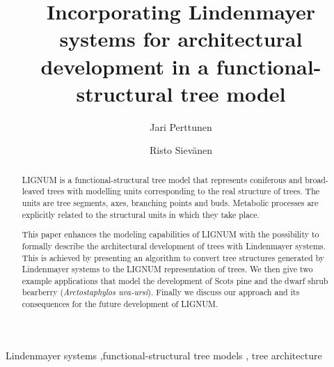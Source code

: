 \documentclass{elsart}
\begin{document}
\begin{frontmatter}


\title{Incorporating Lindenmayer systems for architectural development
in a functional-structural tree model}
\author[Metla]{Jari Perttunen}
\author[Metla]{Risto Siev\"anen}

\address[Metla]{Vantaa   Research  Centre,  Finnish   Forest  Research
Insititute, PL 18.  01301 Vantaa. Finland.}




\begin{abstract}
  LIGNUM  is  a   functional-structural  tree  model  that  represents
  coniferous and broad-leaved trees with modelling units corresponding
  to the real structure of  trees.  The units are tree segments, axes,
  branching  points  and  buds.   Metabolic processes  are  explicitly
  related to the structural units in which they take place.
  
  This  paper enhances the  modeling capabilities  of LIGNUM  with the
  possibility  to formally describe  the architectural  development of
  trees with  Lindenmayer systems. This  is achieved by  presenting an
  algorithm  to  convert  tree  structures  generated  by  Lindenmayer
  systems to  the LIGNUM  representation of trees.   We then  give two
  example applications  that model the  development of Scots  pine and
  the   dwarf  shrub  bearberry   (\textit{Arctostaphylos  uva-ursi}).
  Finally we discuss our approach  and its consequences for the future
  development of LIGNUM.

\end{abstract}

\begin{keyword}

 Lindenmayer systems \sep functional-structural tree models \sep 
 tree architecture


\end{keyword}

\end{frontmatter}







\end{document}
